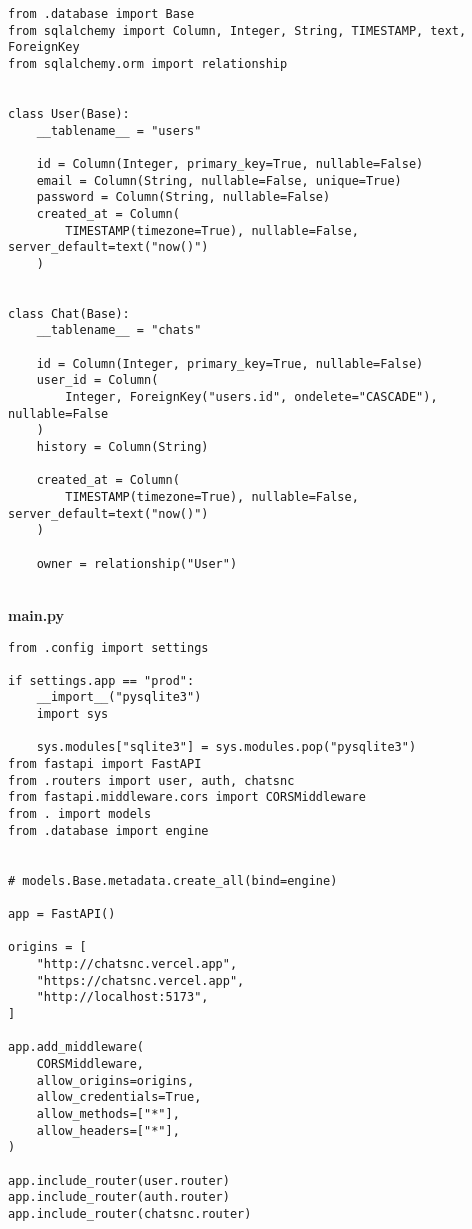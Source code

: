 \begin{Verbatim}[breaklines=true, breakanywhere=true]
from .database import Base
from sqlalchemy import Column, Integer, String, TIMESTAMP, text, ForeignKey
from sqlalchemy.orm import relationship


class User(Base):
    __tablename__ = "users"

    id = Column(Integer, primary_key=True, nullable=False)
    email = Column(String, nullable=False, unique=True)
    password = Column(String, nullable=False)
    created_at = Column(
        TIMESTAMP(timezone=True), nullable=False, server_default=text("now()")
    )


class Chat(Base):
    __tablename__ = "chats"

    id = Column(Integer, primary_key=True, nullable=False)
    user_id = Column(
        Integer, ForeignKey("users.id", ondelete="CASCADE"), nullable=False
    )
    history = Column(String)

    created_at = Column(
        TIMESTAMP(timezone=True), nullable=False, server_default=text("now()")
    )

    owner = relationship("User")

\end{Verbatim}
\
\\
\textbf{main.py}

\begin{Verbatim}[breaklines=true, breakanywhere=true]
from .config import settings

if settings.app == "prod":
    __import__("pysqlite3")
    import sys

    sys.modules["sqlite3"] = sys.modules.pop("pysqlite3")
from fastapi import FastAPI
from .routers import user, auth, chatsnc
from fastapi.middleware.cors import CORSMiddleware
from . import models
from .database import engine


# models.Base.metadata.create_all(bind=engine)

app = FastAPI()

origins = [
    "http://chatsnc.vercel.app",
    "https://chatsnc.vercel.app",
    "http://localhost:5173",
]

app.add_middleware(
    CORSMiddleware,
    allow_origins=origins,
    allow_credentials=True,
    allow_methods=["*"],
    allow_headers=["*"],
)

app.include_router(user.router)
app.include_router(auth.router)
app.include_router(chatsnc.router)
\end{Verbatim}

